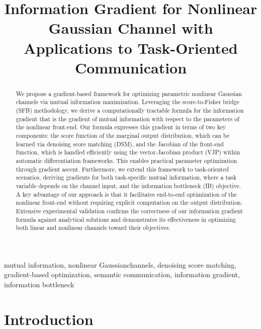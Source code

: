 \documentclass[conference]{IEEEtran}
\begin{document}
\title{Information Gradient for Nonlinear Gaussian Channel with Applications to Task-Oriented Communication}

\author{
}

\maketitle

\begin{abstract}
We propose a gradient-based framework for optimizing parametric nonlinear Gaussian channels 
via mutual information maximization. Leveraging the score-to-Fisher bridge (SFB) methodology, 
we derive a computationally tractable formula for the information gradient that is the gradient 
of mutual information with respect to the parameters of the nonlinear front-end. 
Our formula expresses this gradient in terms of two key components: 
the score function of the marginal output distribution, 
which can be learned via denoising score matching (DSM), 
and the Jacobian of the front-end function, which is handled efficiently 
using the vector-Jacobian product (VJP) within automatic differentiation frameworks. 
This enables practical parameter optimization through gradient ascent.
Furthermore, we extend this framework to task-oriented scenarios, 
deriving gradients for both task-specific mutual information, where a task variable depends 
on the channel input, and the information bottleneck (IB) objective. 
A key advantage of our approach is that it facilitates end-to-end optimization 
of the nonlinear front-end without requiring explicit computation on the output distribution.
Extensive experimental validation confirms the correctness of our information gradient formula against 
analytical solutions and demonstrates its effectiveness in optimizing both linear and nonlinear 
channels toward their objectives.
\end{abstract}

\begin{IEEEkeywords}
mutual information, nonlinear Gaussianchannels, denoising score matching, gradient-based optimization,
semantic communication, information gradient, information bottleneck
\end{IEEEkeywords}


\section{Introduction}
\label{sec:introduction}
\end{document}
